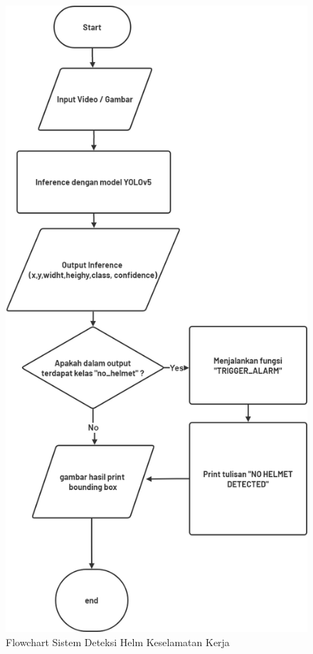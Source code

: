 \begin{figure}[ht]
  \centering
  \includegraphics[height=0.9\textheight]{gambar/flowchart_sistemhedec.png}
  \caption{Flowchart Sistem Deteksi Helm Keselamatan Kerja}
  \label{fig:flchartdeteksi}  
\end{figure}

